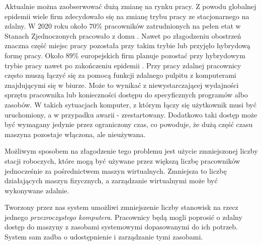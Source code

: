 \documentclass[../wstep.tex]{subfiles}
\begin{document}
Aktualnie można zaobserwować dużą zmianę na rynku pracy.
Z powodu globalnej epidemii wiele firm zdecydowało się na zmianę trybu pracy ze stacjonarnego na zdalny. W 2020 roku około $70\%$ pracowników zatrudnionych na pełen etat w Stanach Zjednoczonych pracowało z domu \parencite{remote-2020}.
Nawet po złagodzeniu obostrzeń znaczna część miejsc pracy pozostała przy takim trybie lub przyjęło hybrydową formę pracy. Około $89\%$ europejskich firm planuje pozostać przy hybrydowym trybie pracy nawet po zakończeniu epidemii \parencite{remote-2021}.
Przy pracy zdalnej pracownicy często muszą łączyć się za pomocą funkcji zdalnego pulpitu z komputerami znajdującymi się w biurze.
Może to wynikać z niewystarczającej wydajności sprzętu pracownika lub konieczności dostępu do specyficznych programów albo zasobów.
W takich sytuacjach komputer, z którym łączy się użytkownik musi być uruchomiony, a w przypadku awarii - zrestartowany.
Dodatkowo taki dostęp może być wymagany jedynie przez ograniczony czas, co powoduje, że dużą część czasu maszyna pozostaje włączona, ale nieużywana.

Możliwym sposobem na złagodzenie tego problemu jest użycie zmniejszonej liczby stacji roboczych, które mogą być używane przez większą liczbę pracowników jednocześnie za pośrednictwem maszyn wirtualnych.
Zmniejsza to liczbę działających maszyn fizycznych, a zarządzanie wirtualnymi może być wykonywane zdalnie.

Tworzony przez nas system umożliwi zmniejszenie liczby stanowisk na rzecz jednego \textit{przezroczystego komputera}.
Pracownicy będą mogli poprosić o zdalny dostęp do maszyny z zasobami systemowymi dopasowanymi do ich potrzeb.
System sam zadba o udostępnienie i zarządzanie tymi zasobami.
\end{document}
